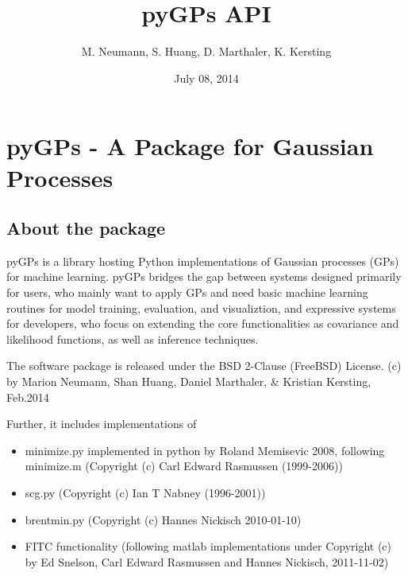 \documentclass[letterpaper,10pt,english]{sphinxmanual}
\title{pyGPs API}
\date{July 08, 2014}
\author{M. Neumann, S. Huang, D. Marthaler, K. Kersting}
\begin{document}
\maketitle
\tableofcontents
{}\label{index::doc}



\chapter{pyGPs - A Package for Gaussian Processes}
\label{index:pygps-a-package-for-gaussian-processes}\label{index:welcome-to-pygps-s-api}

\section{About the package}
\label{index:about-the-package}
pyGPs is a library hosting Python implementations of Gaussian processes (GPs) for
machine learning.
pyGPs bridges the gap between systems designed primarily for users, who mainly
want to apply GPs and need basic machine learning routines for model training, evaluation, and
visualiztion, and expressive systems for developers, who focus on extending the core
functionalities as covariance and likelihood functions, as well as inference techniques.

The software package is released under the BSD 2-Clause (FreeBSD) License.
 (c) by
Marion Neumann, Shan Huang, Daniel Marthaler, \& Kristian Kersting, Feb.2014

Further, it includes implementations of
\begin{itemize}
\item {} 
minimize.py implemented in python by Roland Memisevic 2008, following minimize.m (Copyright (c) Carl Edward Rasmussen (1999-2006))

\item {} 
scg.py (Copyright (c) Ian T Nabney (1996-2001))

\item {} 
brentmin.py (Copyright (c) Hannes Nickisch 2010-01-10)

\item {} 
FITC functionality (following matlab implementations under Copyright (c) by Ed Snelson, Carl Edward Rasmussen and Hannes Nickisch, 2011-11-02)

\end{itemize}
\end{document}
